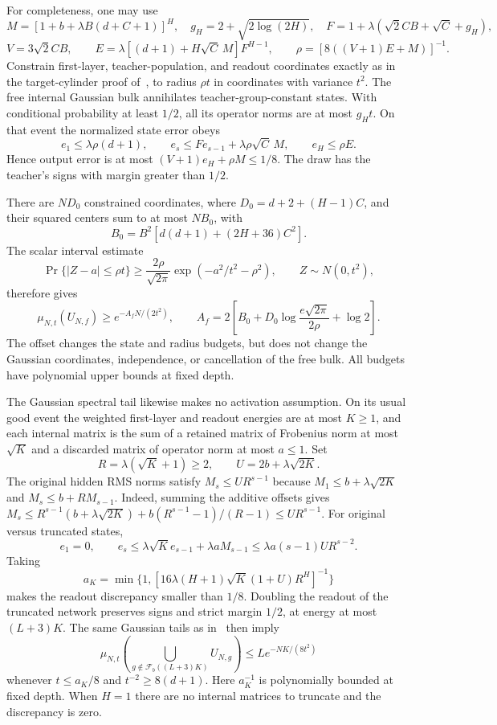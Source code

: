 For completeness, one may use
\[
 M=[1+b+\lambda B(d+C+1)]^H,\quad
 g_H=2+\sqrt{2\log(2H)},\quad
 F=1+\lambda(\sqrt2CB+\sqrt C+g_H),
\]
\[
 V=3\sqrt2CB,\qquad
 E=\lambda[(d+1)+H\sqrt C\,M]F^{H-1},\qquad
 \rho=[8((V+1)E+M)]^{-1}.
\]
Constrain first-layer, teacher-population, and readout coordinates
exactly as in the target-cylinder proof of~\cite{lipschitz}, to radius
$\rho t$ in coordinates with variance $t^2$. The free internal Gaussian
bulk annihilates teacher-group-constant states. With conditional
probability at least $1/2$, all its operator norms are at most $g_Ht$.
On that event the normalized state error obeys
\[
 e_1\le\lambda\rho(d+1),\qquad
 e_s\le Fe_{s-1}+\lambda\rho\sqrt C\,M,
 \qquad e_H\le\rho E.
\]
Hence output error is at most $(V+1)e_H+\rho M\le1/8$.
The draw has the teacher's signs with margin greater than $1/2$.

There are $ND_0$ constrained coordinates, where
$D_0=d+2+(H-1)C$, and their squared centers sum to at most $NB_0$, with
\[
 B_0=B^2[d(d+1)+(2H+36)C^2].
\]
The scalar interval estimate
\[
 \Pr\{|Z-a|\le\rho t\}\ge
 \frac{2\rho}{\sqrt{2\pi}}\exp(-a^2/t^2-\rho^2),
 \qquad Z\sim N(0,t^2),
\]
therefore gives
\begin{equation}\label{eq:offset-target}
 \mu_{N,t}(U_{N,f})\ge e^{-A_fN/(2t^2)},\qquad
 A_f=2\left[B_0+D_0\log\frac{e\sqrt{2\pi}}{2\rho}+\log2\right].
\end{equation}
The offset changes the state and radius budgets, but does not change the
Gaussian coordinates, independence, or cancellation of the free bulk.
All budgets have polynomial upper bounds at fixed depth.

The Gaussian spectral tail likewise makes no activation assumption.
On its usual good event the weighted first-layer and readout energies
are at most $K\ge1$, and each internal matrix is the sum of a retained
matrix of Frobenius norm at most $\sqrt K$ and a discarded matrix of
operator norm at most $a\le1$. Set
\[
 R=\lambda(\sqrt K+1)\ge2,\qquad U=2b+\lambda\sqrt{2K}.
\]
The original hidden RMS norms satisfy $M_s\le UR^{s-1}$ because
$M_1\le b+\lambda\sqrt{2K}$ and $M_s\le b+RM_{s-1}$.
Indeed, summing the additive offsets gives
$M_s\le R^{s-1}(b+\lambda\sqrt{2K})+b(R^{s-1}-1)/(R-1)
\le UR^{s-1}$.
For original versus truncated states,
\[
 e_1=0,\qquad
 e_s\le\lambda\sqrt K e_{s-1}+\lambda aM_{s-1}
 \le\lambda a(s-1)UR^{s-2}.
\]
Taking
\[
 a_K=\min\{1,[16\lambda(H+1)\sqrt K(1+U)R^H]^{-1}\}
\]
makes the readout discrepancy smaller than $1/8$. Doubling the readout
of the truncated network preserves signs and strict margin $1/2$, at
energy at most $(L+3)K$. The same Gaussian tails as in~\cite{lipschitz}
then imply
\begin{equation}\label{eq:offset-spectral}
 \mu_{N,t}\left(\bigcup_{g\notin\mathcal F_b((L+3)K)}U_{N,g}\right)
 \le Le^{-NK/(8t^2)}
\end{equation}
whenever $t\le a_K/8$ and $t^{-2}\ge8(d+1)$.
Here $a_K^{-1}$ is polynomially bounded at fixed depth. When $H=1$
there are no internal matrices to truncate and the discrepancy is zero.

